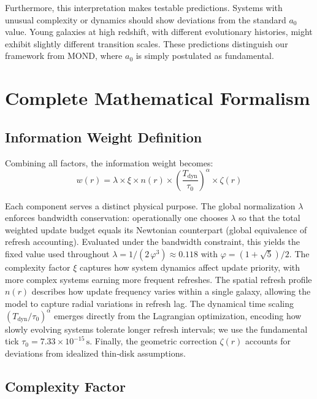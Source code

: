 \documentclass[twocolumn,prd,amsmath,amssymb,aps,superscriptaddress,nofootinbib]{revtex4-2}
\begin{document}
Furthermore, this interpretation makes testable predictions. Systems with unusual complexity or dynamics should show deviations from the standard $a_0$ value. Young galaxies at high redshift, with different evolutionary histories, might exhibit slightly different transition scales. These predictions distinguish our framework from MOND, where $a_0$ is simply postulated as fundamental.

\section{Complete Mathematical Formalism}
\label{sec:formalism}

\subsection{Information Weight Definition}

Combining all factors, the information weight becomes:
\begin{equation}
w(r) = \lambda \times \xi \times n(r) \times \left(\frac{T_{\text{dyn}}}{\tau_0}\right)^\alpha \times \zeta(r)
\end{equation}

Each component serves a distinct physical purpose. The global normalization $\lambda$ enforces bandwidth conservation: operationally one chooses $\lambda$ so that the total weighted update budget equals its Newtonian counterpart (global equivalence of refresh accounting). Evaluated under the bandwidth constraint, this yields the fixed value used throughout $\lambda = 1/(2\,\varphi^3) \approx 0.118$ with $\varphi = (1+\sqrt5)/2$. The complexity factor $\xi$ captures how system dynamics affect update priority, with more complex systems earning more frequent refreshes. The spatial refresh profile $n(r)$ describes how update frequency varies within a single galaxy, allowing the model to capture radial variations in refresh lag. The dynamical time scaling $(T_{\text{dyn}}/\tau_0)^\alpha$ emerges directly from the Lagrangian optimization, encoding how slowly evolving systems tolerate longer refresh intervals; we use the fundamental tick $\tau_0 = 7.33\times10^{-15}\,\mathrm{s}$. Finally, the geometric correction $\zeta(r)$ accounts for deviations from idealized thin‑disk assumptions.

\subsection{Complexity Factor}
\end{document}
